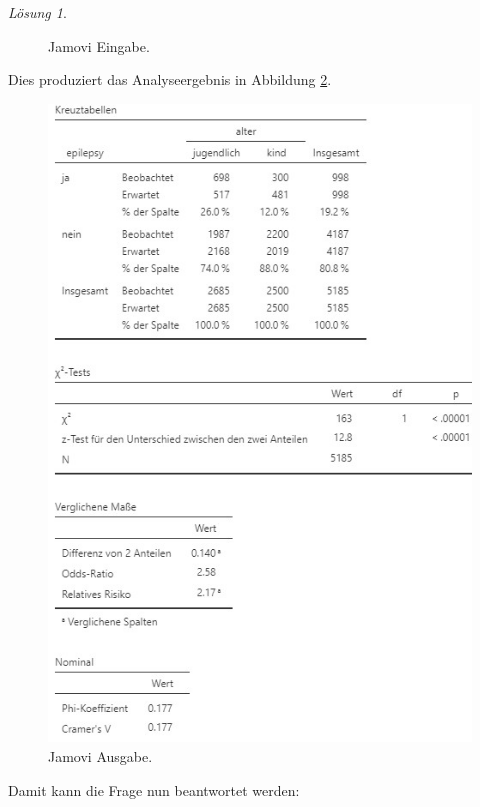 \documentclass[
]{book}
\theoremstyle{definition}
\theoremstyle{definition}
\theoremstyle{definition}
\theoremstyle{definition}
\theoremstyle{remark}
\newtheorem*{solution}{Lösung}
\begin{document}
\begin{solution}
\begin{figure}
{}

\caption{Jamovi Eingabe.}\label{fig:sol-autism-epilepsy-input}
\end{figure}

Dies produziert das Analyseergebnis in Abbildung
\ref{fig:sol-autism-epilepsy-output}.

\begin{figure}

{\centering \includegraphics{figures/09-exr-autism-epilepsy-jmv-output} 

}

\caption{Jamovi Ausgabe.}\label{fig:sol-autism-epilepsy-output}
\end{figure}

Damit kann die Frage nun beantwortet werden:


\end{solution}
\end{document}
